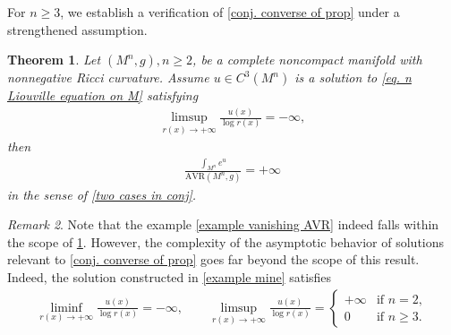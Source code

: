 \documentclass[12pt]{amsart}
\theoremstyle{plain}
\newtheorem{theorem}{Theorem}[section]
\theoremstyle{definition}
\theoremstyle{remark}     %
\newtheorem{remark}[theorem]{Remark}
\begin{document}
For $n\geq 3$, we establish a  verification of \cref{conj. converse of prop} under a strengthened assumption.
\begin{theorem}\label{thm. converse for higher dimensional}
    Let $(M^n,g), n\geq 2$, be a complete noncompact manifold with nonnegative Ricci curvature. Assume $u\in C^3(M^n)$ is a solution to \cref{eq. n Liouville equation on M} satisfying
    \begin{align*}
        \limsup_{r(x)\to+\infty}
        \frac{u(x)}{\log r(x)}
        =-\infty,
    \end{align*}
    then
    \begin{align*}
        \frac{\int_{M^n}e^u}{\mathrm{AVR}(M^n,g)}=+\infty
    \end{align*}
    in the sense of \cref{two cases in conj}.
\end{theorem}
\begin{remark}
    Note that the example \cref{example vanishing AVR} indeed falls within the scope of \cref{thm. converse for higher dimensional}.
However, the complexity of the asymptotic behavior of solutions relevant to \cref{conj. converse of prop} goes far beyond the scope of this result.
    Indeed, the solution constructed in \cref{example mine} satisfies 
\begin{align*}
    \liminf_{r(x)\to+\infty}
    \frac{u(x)}{\log r(x)}=-\infty,\qquad
    \limsup_{r(x)\to+\infty} \frac{u(x)}{\log r(x)}=
    \begin{cases}
        +\infty &\text{if }n=2,\\
        0 &\text{if }n\geq 3.
    \end{cases}
\end{align*}

\end{remark}
\end{document}
